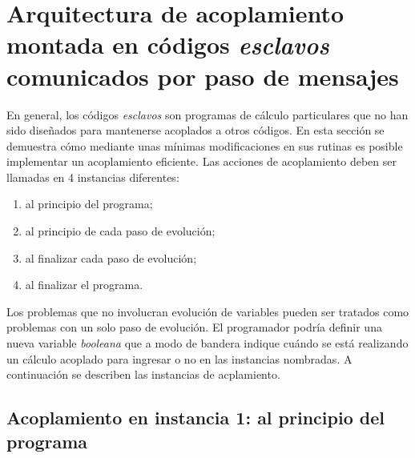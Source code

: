 \section{Arquitectura de acoplamiento montada en códigos \textit{esclavos} comunicados por paso de mensajes}
\label{2:arquitectura-mpi}

En general, los códigos \textit{esclavos} son programas de cálculo particulares que no han sido diseñados para mantenerse acoplados a otros códigos.
En esta sección se demuestra cómo mediante unas mínimas modificaciones en sus rutinas es posible implementar un acoplamiento eficiente.
Las acciones de acoplamiento deben ser llamadas en 4 instancias diferentes:
\begin{enumerate}
\item al principio del programa;
\item al principio de cada paso de evolución;
\item al finalizar cada paso de evolución;
\item al finalizar el programa.
\end{enumerate}
Los problemas que no involucran evolución de variables pueden ser tratados como problemas con un solo paso de evolución.
El programador podría definir una nueva variable \textit{booleana} que a modo de bandera indique cuándo se está realizando un cálculo acoplado para ingresar o no en las instancias nombradas.
A continuación se describen las instancias de acplamiento.

\subsection*{Acoplamiento en instancia 1: al principio del programa}


